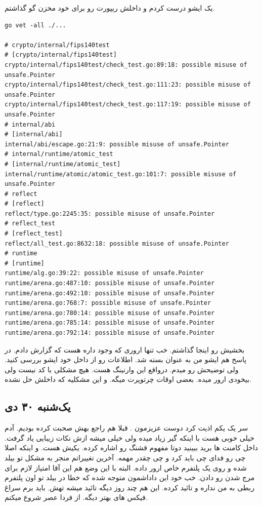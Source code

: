 یک ایشو
درست کردم و داخلش ریپورت  رو برای خود مخزن گو گذاشتم.


\begin{latin}
\begin{verbatim}
go vet -all ./...

# crypto/internal/fips140test
# [crypto/internal/fips140test]
crypto/internal/fips140test/check_test.go:89:18: possible misuse of unsafe.Pointer
crypto/internal/fips140test/check_test.go:111:23: possible misuse of unsafe.Pointer
crypto/internal/fips140test/check_test.go:117:19: possible misuse of unsafe.Pointer
# internal/abi
# [internal/abi]
internal/abi/escape.go:21:9: possible misuse of unsafe.Pointer
# internal/runtime/atomic_test
# [internal/runtime/atomic_test]
internal/runtime/atomic/atomic_test.go:101:7: possible misuse of unsafe.Pointer
# reflect
# [reflect]
reflect/type.go:2245:35: possible misuse of unsafe.Pointer
# reflect_test
# [reflect_test]
reflect/all_test.go:8632:18: possible misuse of unsafe.Pointer
# runtime
# [runtime]
runtime/alg.go:39:22: possible misuse of unsafe.Pointer
runtime/arena.go:487:10: possible misuse of unsafe.Pointer
runtime/arena.go:492:10: possible misuse of unsafe.Pointer
runtime/arena.go:768:7: possible misuse of unsafe.Pointer
runtime/arena.go:780:14: possible misuse of unsafe.Pointer
runtime/arena.go:785:14: possible misuse of unsafe.Pointer
runtime/arena.go:792:14: possible misuse of unsafe.Pointer
\end{verbatim}
\end{latin}

بخشیش رو اینجا گذاشتم. خب تنها اروری که وجود داره  هست که گزارش دادم. در پاسخ هم ایشو من
به عنوان  بسته شد. اطلاعات رو از داخل خود ایشو بررسی کنید. ولی توضیحش رو میدم. درواقع این وارنینگ  هست.
هیچ مشکلی با کد نیست ولی بیخودی ارور میده. بعضی اوقات  چرتوپرت میگه. و این مشکلیه که داخلش حل نشده.

\subsection{یک‌شنبه ۳۰ دی}
سر یک \cl
{}
 یکم اذیت کرد دوست عزیزمون . قبلا هم راجع بهش صحبت کرده بودیم. آدم خیلی خوبی هست با اینکه گیر زیاد میده
 ولی خیلی میشه ازش نکات زیبایی یاد گرفت. داخل کامنت ها برید ببینید دوتا مفهوم قشنگ رو اشاره کرده. یکیش  هست.
 و اینکه اصلا چی رو فدای چی باید کرد و چی چقدر مهمه. آخرین تغییراتم منجر به مشکل تو بیلد شده و روی یک پلتفرم خاص ارور داده. البته با این وضع
 هم این آقا امتیاز لازم برای مرج شدن رو دادن. خب خود این داداشمون متوجه شده که خطا در بیلد تو اون پلتفرم ربطی به من نداره و تائید کرده.
 این هم چند روز دیگه تائید میشه تهش. باید برم سراغ فیکس های بهتر دیگه. از فردا عصر شروع میکنم.

